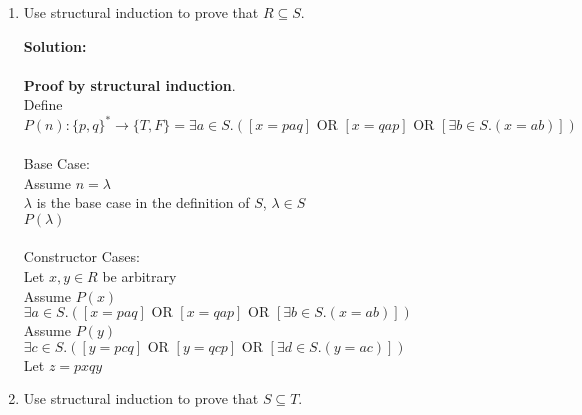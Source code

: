 \documentclass[11pt]{article}
\newcommand{\Or}{\mbox{ OR }}
\begin{document}
\begin{enumerate}
\item
\begin{question}
Use structural induction to prove that $R \subseteq S$.
\end{question}

\begin{solution}
{\bf Solution:}\\\\
{\bf  Proof by structural induction}.\\
Define $P(n): \{p,q\}^* \rightarrow \{T,F\}=\exists a\in S.\left([x=paq]\Or[x=qap]\Or[\exists b\in S.(x=ab)]\right)$\\\\
Base Case:\\
\null\quad Assume $n=\lambda$\\
\null\quad $\lambda$ is the base case in the definition of $S$, $\lambda\in S$\\
\null\quad $P(\lambda)$\\\\
Constructor Cases:\\
\null\quad Let $x,y\in R$ be arbitrary\\
\null\qquad Assume $P(x)$\\
\null\qquad $\exists a\in S.\left([x=paq]\Or[x=qap]\Or[\exists b\in S.(x=ab)]\right)$\\
\null\qquad\quad Assume $P(y)$\\
\null\qquad\quad $\exists c\in S.\left([y=pcq]\Or[y=qcp]\Or[\exists d\in S.(y=ac)]\right)$\\
\null\qquad\qquad Let $z = pxqy$\\
\null\qquad\qquad

\end{solution}

\item
\begin{question}
Use structural induction to prove that $S \subseteq T$.
\end{question}


\end{enumerate}
\end{document}
